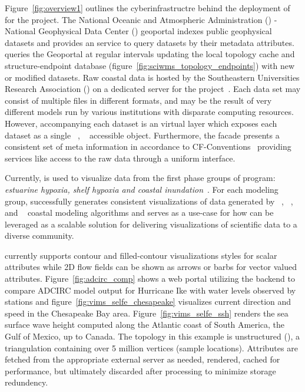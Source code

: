 Figure~\ref{fig:overview1} outlines the cyberinfrastructre behind the
deployment of \sciwms{} for the \comt{} project. The National Oceanic
and Atmospheric Administration (\noaa{}) - National Geophysical Data
Center (\ngdc{}) geoportal indexes public geophysical datasets and
provides an \ogc{} \csw{} service to query datasets by their metadata
attributes. \sciwms{} queries the \ngdc{} Geoportal at regular
intervals updating the local topology cache and structure-endpoint
database (figure~\ref{fig:sciwms_topology_endpoints}) with new or
modified datasets. Raw coastal data is hosted by the Southeastern
Universities Research Association (\sura{}) on a dedicated server for
the \comt{} project~\cite{luettich12}. Each data set may consist of
multiple files in different formats, and may be the result of very
different models run by various institutions with disparate computing
resources. However, accompanying each dataset is an \ncml{} virtual
layer which exposes each dataset as a single \netcdf{}~\cite{netcdf},
\opendap{}~\cite{Cornillon03} accessible object. Furthermore, the
\ncml{} facade presents a consistent set of meta information in
accordance to CF-Conventions~\cite{cf} providing services like
\sciwms{} access to the raw data through a uniform interface.

Currently, \Sciwms{} is used to visualize data from the first phase
groups of \ioos{} \comt{} program: {\em estuarine hypoxia, shelf
  hypoxia and coastal inundation}~\cite{luettich13}. For each modeling
group, \sciwms{} successfully generates consistent visualizations of
data generated by \adcirc{}~\cite{adcirc}, \fvcom{}~\cite{chen06},
\selfe{}~\cite{zhang08} and \slosh{}~\cite{chen84} coastal modeling
algorithms and serves as a use-case for how \sciwms{} can be leveraged
as a scalable solution for delivering visualizations of
scientific data to a diverse community.

\sciwms{} currently supports contour and filled-contour visualizations
styles for scalar attributes while 2D flow fields can be shown as
arrows or barbs for vector valued
attributes. Figure~\ref{fig:adcirc_comp} shows a web portal utilizing
the \sciwms{} backend to compare ADCIRC model output for Hurricane Ike
with water levels observed by \noaa{} stations and
figure~\ref{fig:vims_selfe_chesapeake} visualizes current direction
and speed in the Chesapeake Bay area. Figure~\ref{fig:vims_selfe_ssh}
renders the sea surface wave height computed along the Atlantic coast
of South America, the Gulf of Mexico, up to Canada. The topology in
this example is unstructured (\ugrid{}), a triangulation containing
over 5 million vertices (sample locations). Attributes are fetched
from the appropriate external server as needed, rendered, cached for
performance, but ultimately discarded after processing to minimize
storage redundency.

